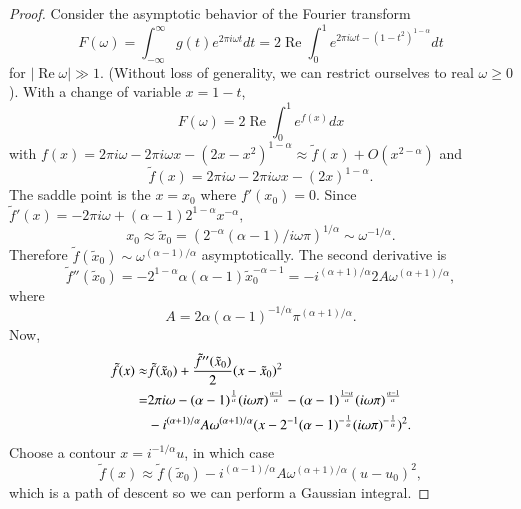 \begin{proof}
Consider the asymptotic behavior of the Fourier transform
$$
F(\omega )=\int_{-\infty}^{\infty} g(t) e^{2\pi i \omega  t} dt=2 \operatorname{Re} \int_{0}^{1} e^{2\pi i \omega  t- (1-t^{2})^{1-\alpha}} dt
$$
for $|\operatorname{Re} \omega | \gg 1.$ (Without loss of generality, we can restrict ourselves to real $\omega  \geq 0$).  
With a change of variable $x=1-t$,
$$
F(\omega )=2 \operatorname{Re} \int_{0}^{1} e^{f(x)} dx
$$
with 
$
f(x)=2\pi i \omega  - 2\pi i \omega   x- (2x-x^2)^{1-\alpha}\approx \tilde f(x)+O\left(x^{2-\alpha}\right)
$
and 
$$
\tilde f(x) = 2\pi i \omega  - 2\pi i \omega    x - (2 x)^{1-\alpha}.
$$
The saddle point is the $x=x_0$ where $f'(x_0)=0$. Since
$
\tilde f'(x)=-2\pi i \omega  + (\alpha-1)2^{1-\alpha} x^{-\alpha},
$
$$
x_{0} \approx \tilde x_0=\left (2^{-\alpha} (\alpha-1) / i \omega \pi \right )^{1 / \alpha} \sim \omega ^{-1 / \alpha}.
$$
Therefore $\tilde f(\tilde x_{0}) \sim \omega ^{(\alpha-1) / \alpha}$ asymptotically. The second derivative is 
$$
\tilde f'' (\tilde x_{0} )=-2^{1-\alpha}  \alpha(\alpha-1) \tilde x_{0}^{-\alpha-1}=-i^{(\alpha+1) / \alpha} 2 A \omega ^{(\alpha+1)/\alpha},
$$
where
$$
A=2\alpha  (\alpha-1)^{-1/\alpha}\pi^{(\alpha+1)/\alpha}.
$$
Now,
\begin{equation}
\begin{split}
\tilde f(x)\approx &\tilde f(\tilde x_0) + {\tilde f''(\tilde x_0)\over 2} (x-\tilde x_0)^2
\\
=&2\pi i \omega  - (\alpha - 1)^{1\over \alpha}(i\omega \pi )^{\alpha -1\over \alpha}  - (\alpha - 1)^{1-\alpha\over \alpha} (i\omega \pi )^{\alpha -1\over \alpha}
\\
&-i^{(\alpha+1) / \alpha} A \omega ^{(\alpha+1)/\alpha}(x- 2^{-1}(\alpha - 1)^{-{1\over \alpha}}(i\omega \pi )^{-{1\over \alpha}} )^2.
\end{split}
\end{equation} 
Choose a contour $x=i^{-1 / \alpha}u$, in which case  
$$
\tilde f(x) \approx \tilde f(\tilde x_{0}) -i^{(\alpha-1) / \alpha} A \omega ^{(\alpha+1) / \alpha}\left(u-u_{0}\right)^{2},
$$
which is a path of descent so we can perform a Gaussian integral. 


\end{proof}
